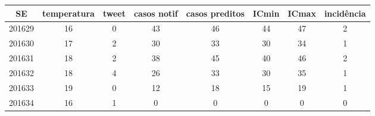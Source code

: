 \begin{tabular}{c|ccccccc}
  \hline
SE & temperatura & tweet & casos notif & casos preditos & ICmin & ICmax & incidência \\ 
  \hline
201629 & 16 & 0 & 43 & 46 & 44 & 47 & 2 \\ 
  201630 & 17 & 2 & 30 & 33 & 30 & 34 & 1 \\ 
  201631 & 18 & 2 & 38 & 45 & 40 & 46 & 2 \\ 
  201632 & 18 & 4 & 26 & 33 & 30 & 35 & 1 \\ 
  201633 & 19 & 0 & 12 & 18 & 15 & 19 & 1 \\ 
  201634 & 16 & 1 & 0 & 0 & 0 & 0 & 0 \\ 
   \hline
\end{tabular}
